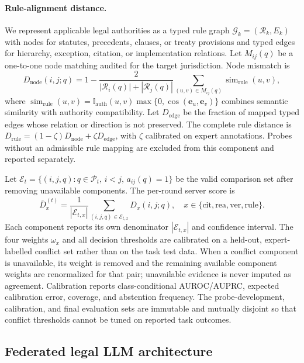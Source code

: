\documentclass[a4paper,fleqn]{cas-sc}
\newcommand{\graph}{\mathcal{G}}
\newcommand{\rules}{\mathcal{R}}
\begin{document}
\paragraph{Rule-alignment distance.}
We represent applicable legal authorities as a typed rule graph $\graph_k=(\rules_k,E_k)$ with nodes for statutes, precedents, clauses, or treaty provisions and typed edges for hierarchy, exception, citation, or implementation relations. Let $M_{ij}(q)$ be a one-to-one node matching audited for the target jurisdiction. Node mismatch is
\begin{equation}
    D_{\mathrm{node}}(i,j;q) =
    1 - \frac{2}{|\rules_i(q)|+|\rules_j(q)|}
    \sum_{(u,v)\in M_{ij}(q)}
    \operatorname{sim}_{\mathrm{rule}}(u,v),
\end{equation}
where $\operatorname{sim}_{\mathrm{rule}}(u,v)=\mathbb{I}_{\mathrm{auth}}(u,v)\max\{0,\cos(\bm{e}_u,\bm{e}_v)\}$ combines semantic similarity with authority compatibility. Let $D_{\mathrm{edge}}$ be the fraction of mapped typed edges whose relation or direction is not preserved. The complete rule distance is $D_{\mathrm{rule}}=(1-\zeta)D_{\mathrm{node}}+\zeta D_{\mathrm{edge}}$, with $\zeta$ calibrated on expert annotations. Probes without an admissible rule mapping are excluded from this component and reported separately.

Let $\mathcal{E}_t=\{(i,j,q):q\in\mathcal{P}_t,\,i<j,\,a_{ij}(q)=1\}$ be the valid comparison set after removing unavailable components. The per-round server score is
\begin{equation}
    \overline{D}_{x}^{(t)} =
    \frac{1}{|\mathcal{E}_{t,x}|}
    \sum_{(i,j,q)\in\mathcal{E}_{t,x}} D_{x}(i,j;q),
    \quad x \in \{\mathrm{cit},\mathrm{rea},\mathrm{ver},\mathrm{rule}\}.
\end{equation}
Each component reports its own denominator $|\mathcal{E}_{t,x}|$ and confidence interval. The four weights $\omega_x$ and all decision thresholds are calibrated on a held-out, expert-labelled conflict set rather than on the task test data.
When a conflict component is unavailable, its weight is removed and the remaining available component weights are renormalized for that pair; unavailable evidence is never imputed as agreement. Calibration reports class-conditional AUROC/AUPRC, expected calibration error, coverage, and abstention frequency. The probe-development, calibration, and final evaluation sets are immutable and mutually disjoint so that conflict thresholds cannot be tuned on reported task outcomes.

\subsection{Federated legal LLM architecture}
\end{document}
